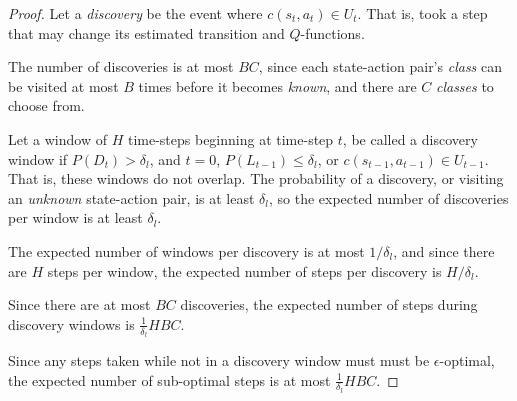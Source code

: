 \begin{proof}
Let a \emph{discovery} be the event where $c(s_t,a_t) \in U_t$. That is, \A took a step that may change its estimated transition and $Q$-functions.

The number of discoveries is at most $B C$, since each state-action pair's \emph{class} can be visited at most $B$ times before it becomes \emph{known}, and there are $C$ \emph{classes} to choose from.

Let a window of $H$ time-steps beginning at time-step $t$, be called a discovery window if $P(D_t) > \delta_l$, and $t=0$, $P(L_{t-1}) \leq \delta_l$, or $c(s_{t-1},a_{t-1}) \in U_{t-1}$. That is, these windows do not overlap. The probability of a discovery, or visiting an \emph{unknown} state-action pair, is at least $\delta_l$, so the expected number of discoveries per window is at least $\delta_l$.

The expected number of windows per discovery is at most $1/\delta_l$, and since there are $H$ steps per window, the expected number of steps per discovery is $H / \delta_l$.

Since there are at most $B C$ discoveries, the expected number of steps during discovery windows is $\frac 1 {\delta_l} H B C$.

Since any steps taken while not in a discovery window must must be $\epsilon$-optimal, the expected number of sub-optimal steps is at most $\frac 1 {\delta_l} H B C$.

\end{proof}
